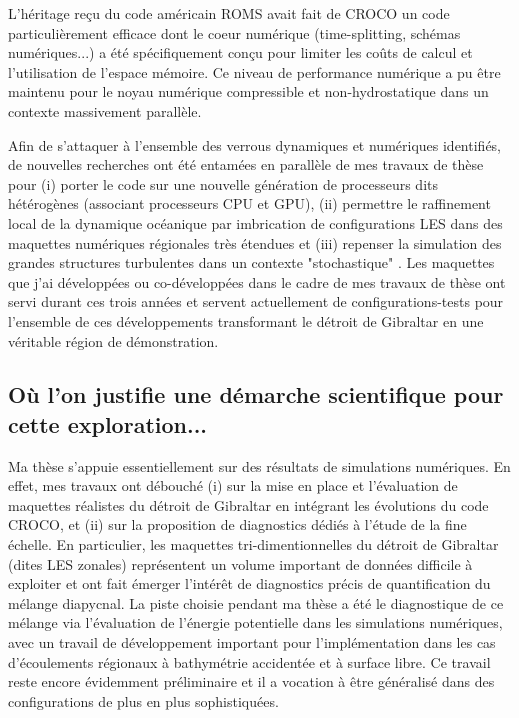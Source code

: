 L'héritage reçu du code américain ROMS \citep{shchepetkin_regional_2005} avait fait de CROCO un code particulièrement efficace dont le coeur numérique (time-splitting, schémas numériques...) a été spécifiquement conçu pour limiter les coûts de calcul et l'utilisation de l'espace mémoire. Ce niveau de performance numérique a pu être maintenu pour le noyau numérique compressible et non-hydrostatique dans un contexte massivement parallèle.

Afin de s'attaquer à l'ensemble des verrous dynamiques et numériques identifiés, de nouvelles recherches ont été entamées en parallèle de mes travaux de thèse pour (i) porter le code sur une nouvelle génération de processeurs dits hétérogènes (associant processeurs CPU et GPU), (ii) permettre le raffinement local de la dynamique océanique par imbrication de configurations LES dans des maquettes numériques régionales très étendues et (iii) repenser la simulation des grandes structures turbulentes dans un contexte "stochastique" \cite{memin_fluid_2014}. Les maquettes que j'ai développées ou co-développées dans le cadre de mes travaux de thèse ont servi durant ces trois années et servent actuellement de configurations-tests pour l'ensemble de ces développements transformant le détroit de Gibraltar en une véritable région de démonstration. \color{black}

\subsection{Où l'on justifie une démarche scientifique pour cette exploration...}

Ma thèse s'appuie essentiellement sur des résultats de simulations numériques. En effet, mes travaux ont débouché (i) sur la mise en place et l'évaluation de maquettes réalistes du détroit de Gibraltar en intégrant les évolutions du code CROCO, et (ii) sur la proposition de diagnostics dédiés à l'étude de la fine échelle. En particulier, les maquettes tri-dimentionnelles du détroit de Gibraltar (dites LES zonales) représentent un volume important de données difficile à exploiter et ont fait émerger l'intérêt de diagnostics précis de quantification du mélange diapycnal. La piste choisie pendant ma thèse a été le diagnostique de ce mélange via l'évaluation de l'énergie potentielle dans les simulations numériques, avec un travail de développement important pour l'implémentation dans les cas d'écoulements régionaux à bathymétrie accidentée et à surface libre. Ce travail reste encore évidemment préliminaire et il a vocation à être généralisé dans des configurations de plus en plus sophistiquées.

